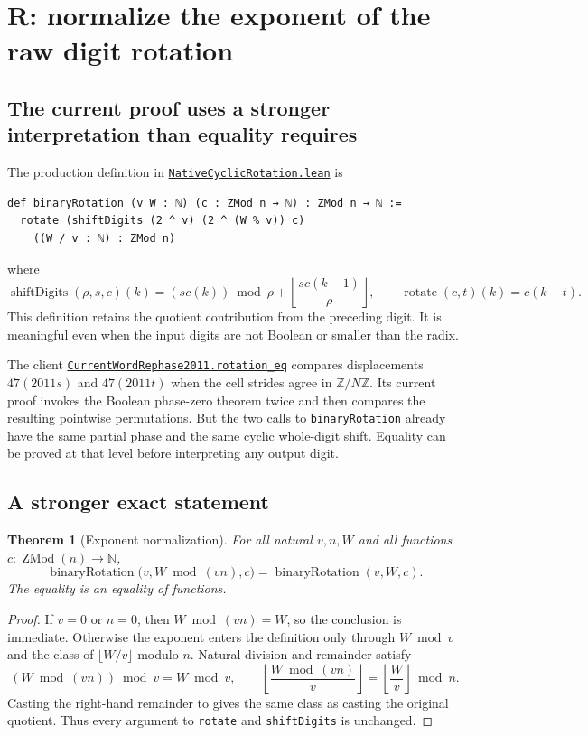 \documentclass[11pt,letterpaper]{article}
\newcommand{\code}[1]{\nolinkurl{#1}}
\newcommand{\src}[2]{\href{https://github.com/VladimirReshetnikov/ProveIt/blob/9d9d1123b39927d30363f1dcd53c23f0575c30ee/Computability/DiophantineConsistency/Lean/DiophantineConsistency/#1.lean}{\code{#2}}}
\newtheorem{theorem}{Theorem}[section]
\begin{document}
\section{R: normalize the exponent of the raw digit rotation}

\subsection{The current proof uses a stronger interpretation than equality requires}

The production definition in \src{NativeCyclicRotation}{NativeCyclicRotation.lean} is
\begin{lstlisting}
def binaryRotation (v W : ℕ) (c : ZMod n → ℕ) : ZMod n → ℕ :=
  rotate (shiftDigits (2 ^ v) (2 ^ (W % v)) c)
    ((W / v : ℕ) : ZMod n)
\end{lstlisting}
where
\[
 \operatorname{shiftDigits}(\rho,s,c)(k)
 = (s c(k))\bmod\rho
   +\left\lfloor\frac{s c(k-1)}{\rho}\right\rfloor,
 \qquad \operatorname{rotate}(c,t)(k)=c(k-t).
\]
This definition retains the quotient contribution from the preceding digit. It is meaningful even when the input digits are not Boolean or smaller than the radix.

The client \src{CurrentWordRephase2011}{CurrentWordRephase2011.rotation_eq} compares displacements $47(2011s)$ and $47(2011t)$ when the cell strides agree in $\mathbb Z/N\mathbb Z$. Its current proof invokes the Boolean phase-zero theorem twice and then compares the resulting pointwise permutations. But the two calls to \code{binaryRotation} already have the same partial phase and the same cyclic whole-digit shift. Equality can be proved at that level before interpreting any output digit.

\subsection{A stronger exact statement}

\begin{theorem}[Exponent normalization]
For all natural $v,n,W$ and all functions $c:\operatorname{ZMod}(n)\to\mathbb N$,
\[
 \operatorname{binaryRotation}\bigl(v,W\bmod(vn),c\bigr)
 =\operatorname{binaryRotation}(v,W,c).
\]
The equality is an equality of functions.
\end{theorem}
\begin{proof}
If $v=0$ or $n=0$, then $W\bmod(vn)=W$, so the conclusion is immediate. Otherwise the exponent enters the definition only through $W\bmod v$ and the class of $\lfloor W/v\rfloor$ modulo $n$. Natural division and remainder satisfy
\[
 (W\bmod(vn))\bmod v=W\bmod v,
 \qquad
 \left\lfloor\frac{W\bmod(vn)}v\right\rfloor
 =\left\lfloor\frac Wv\right\rfloor\bmod n.
\]
Casting the right-hand remainder to \texttt{} gives the same class as casting the original quotient. Thus every argument to \code{rotate} and \code{shiftDigits} is unchanged.
\end{proof}
\end{document}
